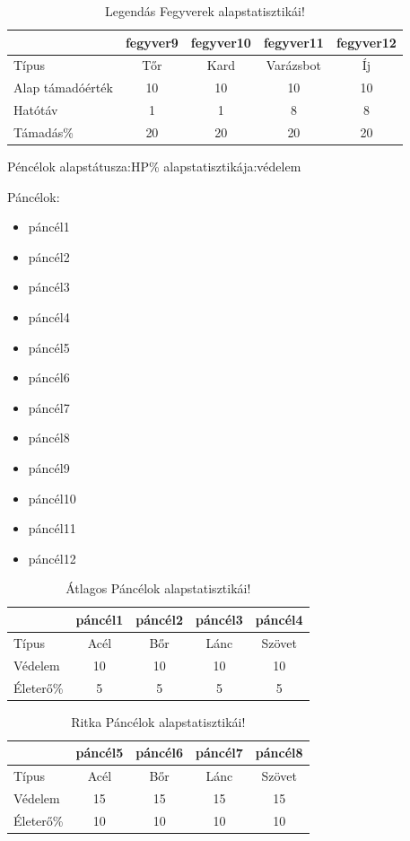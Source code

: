 \begin{table}[h]
\centering
\caption{Legendás Fegyverek alapstatisztikái!}
\label{tab:minta}
\begin{tabular}{|l|c|c|c|c|}
\hline
 & fegyver9 & fegyver10 & fegyver11 & fegyver12  \\
\hline
Típus & Tőr & Kard & Varázsbot & Íj\\
\hline
Alap támadóérték & 10 & 10 & 10 & 10 \\
\hline
Hatótáv & 1 & 1 & 8 & 8 \\
\hline
Támadás\% & 20 & 20 & 20 & 20 \\
\hline
\end{tabular}
\end{table}

\newpage

Péncélok alapstátusza:HP\% alapstatisztikája:védelem

Páncélok:

\begin{itemize}
  \item páncél1
  \item páncél2
  \item páncél3
  \item páncél4
  \item páncél5
  \item páncél6
  \item páncél7
  \item páncél8
  \item páncél9
  \item páncél10
  \item páncél11
  \item páncél12
\end{itemize}

\begin{table}[h]
\centering
\caption{Átlagos Páncélok alapstatisztikái!}
\label{tab:minta}
\begin{tabular}{|l|c|c|c|c|}
\hline
 & páncél1 & páncél2 & páncél3 & páncél4  \\
\hline
Típus & Acél & Bőr & Lánc & Szövet\\
\hline
Védelem & 10 & 10 & 10 & 10 \\
\hline
Életerő\% & 5 & 5 & 5 & 5 \\
\hline
\end{tabular}
\end{table}

\begin{table}[h]
\centering
\caption{Ritka Páncélok alapstatisztikái!}
\label{tab:minta}
\begin{tabular}{|l|c|c|c|c|}
\hline
 & páncél5 & páncél6 & páncél7 & páncél8  \\
\hline
Típus & Acél & Bőr & Lánc & Szövet\\
\hline
Védelem & 15 & 15 & 15 & 15 \\
\hline
Életerő\% & 10 & 10 & 10 & 10 \\
\hline
\end{tabular}
\end{table}

